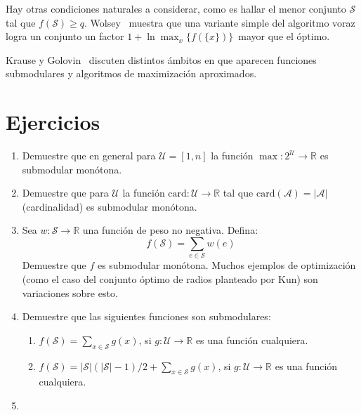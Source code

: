   Hay otras condiciones naturales a considerar,
  como es hallar el menor conjunto \(\mathscr{S}\)
  tal que \(f(\mathscr{S}) \ge q\).
  Wolsey~%
    \cite{wolsey82:_analy_greed_algor_submod_set_cover_probl}
  muestra que una variante simple del algoritmo voraz
  logra un conjunto un factor \(1 + \ln \max_x \{f(\{x\})\}\)~mayor
  que el óptimo.

  Krause y Golovin~%
    \cite{krause14:_submodular_survey}
  discuten distintos ámbitos en que aparecen funciones submodulares
  y algoritmos de maximización aproximados.

\section*{Ejercicios}
\label{sec:ejercicios-submodular}

  \begin{enumerate}
  \item
    Demuestre que en general para \(\mathscr{U} = [1, n]\) la función
    \(\max \colon 2^{\mathscr{U}} \to \mathbb{R}\) es submodular monótona.
  \item
    Demuestre que para \(\mathscr{U}\) la función
    \(\mathrm{card} \colon \mathscr{U} \to \mathbb{R}\)
    tal que \(\mathrm{card}(\mathscr{A}) = \lvert \mathscr{A} \rvert\)
    (cardinalidad)
    es submodular monótona.
  \item
    Sea \(w \colon \mathscr{S} \to \mathbb{R}\)
    una función de peso no negativa.
    Defina:
    \begin{equation*}
      f(\mathscr{S})
        = \sum_{e \in \mathscr{S}} w(e)
    \end{equation*}
    Demuestre que \(f\) es submodular monótona.
    Muchos ejemplos de optimización
    (como el caso del conjunto óptimo de radios planteado por Kun)
    son variaciones sobre esto.
  \item
    Demuestre que las siguientes funciones son submodulares:
    \begin{enumerate}
    \item
      \(f(\mathscr{S}) = \sum_{x \in \mathscr{S}} g(x)\),
      si \(g \colon \mathscr{U} \to \mathbb{R}\) es una función cualquiera.
    \item
      \(f(\mathscr{S})
           = \lvert \mathscr{S} \rvert (\lvert \mathscr{S} \rvert - 1) / 2
               + \sum_{x \in \mathscr{S}} g(x)\),
      si \(g \colon \mathscr{U} \to \mathbb{R}\) es una función cualquiera.
    \end{enumerate}
  \item

\end{enumerate}
